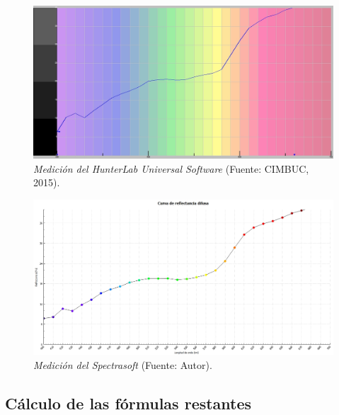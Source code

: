  	\begin{figure}[H]
		\centering
		\includegraphics[scale=0.45]{img/medicion-hunterlab.jpg}
			\caption[Medici\'{o}n del HunterLab Universal Software]{\textit{Medici\'{o}n del HunterLab Universal Software} (Fuente: CIMBUC, 2015).}
	\end{figure}	
	
 	\begin{figure}[H]
		\centering
		\includegraphics[scale=0.4]{img/medicion-spectrasoft.jpg}
			\caption[Medici\'{o}n del Spectrasoft]{\textit{Medici\'{o}n del Spectrasoft} (Fuente: Autor).}
	\end{figure}
	
\subsection{C\'{a}lculo de las f\'{o}rmulas restantes}

